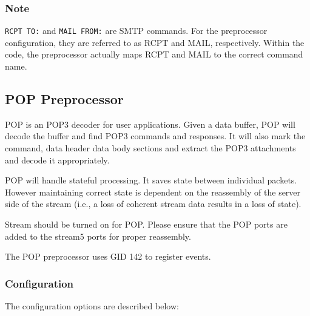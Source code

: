 \documentclass[english]{report}
\begin{document}
\subsubsection{Note}

\texttt{RCPT TO:} and \texttt{MAIL FROM:} are SMTP commands.  For the
preprocessor configuration, they are referred to as RCPT and MAIL,
respectively.  Within the code, the preprocessor actually maps RCPT and MAIL to
the correct command name.

\subsection{POP Preprocessor}
\label{POP}

POP is an POP3 decoder for user applications. Given a data buffer,
POP will decode the buffer and find POP3 commands and responses.
It will also mark the command, data header data body sections and
extract the POP3 attachments and decode it appropriately.

POP will handle stateful processing. It saves state between individual
packets. However maintaining correct state is dependent on the reassembly
of the server side of the stream (i.e., a loss of coherent stream data results
in a loss of state).

Stream should be turned on for POP. Please ensure that the POP ports are added
 to the stream5 ports for proper reassembly.

The POP preprocessor uses GID 142 to register events.

\subsubsection{Configuration}

The configuration options are described below:
\end{document}
